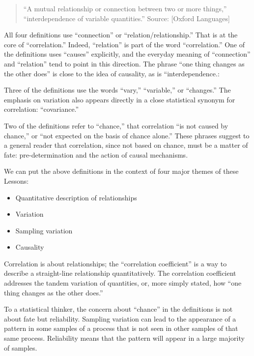 \documentclass[
  letterpaper,
  DIV=11,
  numbers=noendperiod,
  oneside]{scrreprt}
\providecommand{\tightlist}{%
  \setlength{\itemsep}{0pt}\setlength{\parskip}{0pt}}\usepackage{longtable,booktabs,array}
\begin{document}
\begin{quote}
``A mutual relationship or connection between two or more things,''
``interdependence of variable quantities.'' Source: {[}Oxford
Languages{]}
\end{quote}

All four definitions use ``connection'' or ``relation/relationship.''
That is at the core of ``correlation.'' Indeed, ``relation'' is part of
the word ``correlation.'' One of the definitions uses ``causes''
explicitly, and the everyday meaning of ``connection'' and ``relation''
tend to point in this direction. The phrase ``one thing changes as the
other does'' is close to the idea of causality, as is
``interdependence.:

Three of the definitions use the words ``vary,'' ``variable,'' or
``changes.'' The emphasis on variation also appears directly in a close
statistical synonym for correlation: ``covariance.''

Two of the definitions refer to ``chance,'' that correlation ``is not
caused by chance,'' or ``not expected on the basis of chance alone.''
These phrases suggest to a general reader that correlation, since not
based on chance, must be a matter of fate: pre-determination and the
action of causal mechanisms.

We can put the above definitions in the context of four major themes of
these Lessons:

\begin{itemize}
\tightlist
\item
  Quantitative description of relationships
\item
  Variation
\item
  Sampling variation
\item
  Causality
\end{itemize}

Correlation is about relationships; the ``correlation coefficient'' is a
way to describe a straight-line relationship quantitatively. The
correlation coefficient addresses the tandem variation of quantities,
or, more simply stated, how ``one thing changes as the other does.''

To a statistical thinker, the concern about ``chance'' in the
definitions is not about fate but reliability. Sampling variation can
lead to the appearance of a pattern in some samples of a process that is
not seen in other samples of that same process. Reliability means that
the pattern will appear in a large majority of samples.
\end{document}
